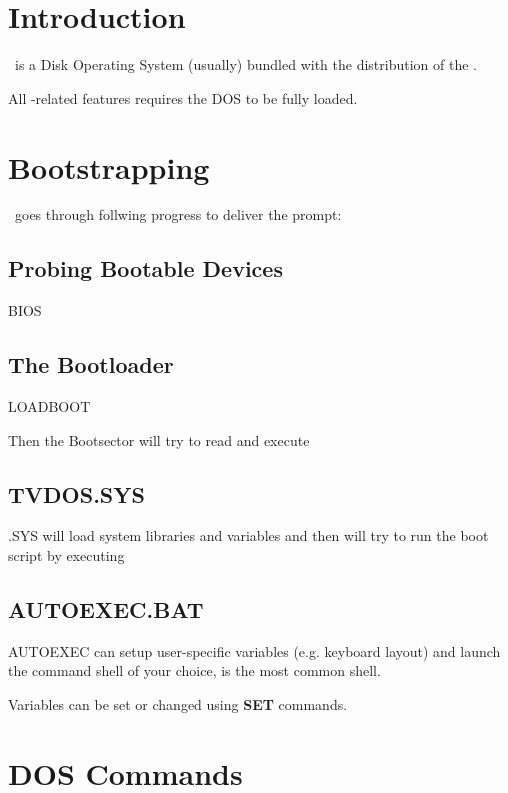 \chapter{Introduction}

\thedos\ is a Disk Operating System (usually) bundled with the distribution of the \thismachine.

All \thedos-related features requires the DOS to be fully loaded.




\chapter{Bootstrapping}

\thedos\ goes through follwing progress to deliver the  prompt:

\section{Probing Bootable Devices}
BIOS

\section{The Bootloader}
LOADBOOT

Then the Bootsector will try to read and execute 

\section{TVDOS.SYS}
\thedos.SYS will load system libraries and variables and then will try to run the boot script by executing 

\section{AUTOEXEC.BAT}

AUTOEXEC can setup user-specific variables (e.g. keyboard layout) and launch the command shell of your choice,  is the most common shell.

Variables can be set or changed using \textbf{SET} commands.



\chapter{DOS Commands}


